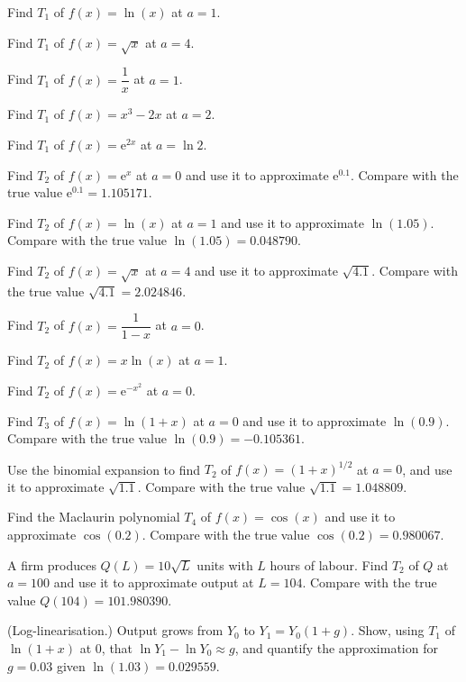 \begin{problems}
  \item Find $T_{1}$ of $f(x)=\ln(x)$ at $a=1$.
  \item Find $T_{1}$ of $f(x)=\sqrt{x}$ at $a=4$.
  \item Find $T_{1}$ of $f(x)=\dfrac{1}{x}$ at $a=1$.
  \item Find $T_{1}$ of $f(x)=x^{3}-2x$ at $a=2$.
  \item Find $T_{1}$ of $f(x)=\mathrm{e}^{2x}$ at $a=\ln 2$.
  \item Find $T_{2}$ of $f(x)=\mathrm{e}^{x}$ at $a=0$ and use it to
        approximate $\mathrm{e}^{0.1}$. Compare with the true value
        $\mathrm{e}^{0.1}=1.105171$.
  \item Find $T_{2}$ of $f(x)=\ln(x)$ at $a=1$ and use it to
        approximate $\ln(1.05)$. Compare with the true value
        $\ln(1.05)=0.048790$.
  \item Find $T_{2}$ of $f(x)=\sqrt{x}$ at $a=4$ and use it to
        approximate $\sqrt{4.1}$. Compare with the true value
        $\sqrt{4.1}=2.024846$.
  \item Find $T_{2}$ of $f(x)=\dfrac{1}{1-x}$ at $a=0$.
  \item Find $T_{2}$ of $f(x)=x\ln(x)$ at $a=1$.
  \item Find $T_{2}$ of $f(x)=\mathrm{e}^{-x^{2}}$ at $a=0$.
  \item Find $T_{3}$ of $f(x)=\ln(1+x)$ at $a=0$ and use it to
        approximate $\ln(0.9)$. Compare with the true value
        $\ln(0.9)=-0.105361$.
  \item Use the binomial expansion to find $T_{2}$ of
        $f(x)=(1+x)^{1/2}$ at $a=0$, and use it to approximate
        $\sqrt{1.1}$. Compare with the true value
        $\sqrt{1.1}=1.048809$.
  \item Find the Maclaurin polynomial $T_{4}$ of $f(x)=\cos(x)$ and use
        it to approximate $\cos(0.2)$. Compare with the true value
        $\cos(0.2)=0.980067$.
  \item A firm produces $Q(L)=10\sqrt{L}$ units with $L$ hours of
        labour. Find $T_{2}$ of $Q$ at $a=100$ and use it to
        approximate output at $L=104$. Compare with the true value
        $Q(104)=101.980390$.
  \item (Log-linearisation.) Output grows from $Y_{0}$ to
        $Y_{1}=Y_{0}(1+g)$. Show, using $T_{1}$ of $\ln(1+x)$ at $0$,
        that $\ln Y_{1}-\ln Y_{0}\approx g$, and quantify the
        approximation for $g=0.03$ given $\ln(1.03)=0.029559$.

\end{problems}
